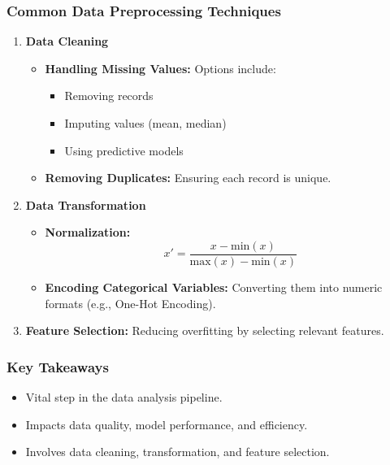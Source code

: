 \documentclass{beamer}
\begin{document}
\begin{frame}[fragile]
    \frametitle{Common Data Preprocessing Techniques}
    \begin{enumerate}
        \item \textbf{Data Cleaning}
            \begin{itemize}
                \item \textbf{Handling Missing Values:} Options include:
                    \begin{itemize}
                        \item Removing records
                        \item Imputing values (mean, median)
                        \item Using predictive models
                    \end{itemize}
                \item \textbf{Removing Duplicates:} Ensuring each record is unique.
            \end{itemize}
        \item \textbf{Data Transformation}
            \begin{itemize}
                \item \textbf{Normalization:}
                    \begin{equation} 
                    x' = \frac{x - \text{min}(x)}{\text{max}(x) - \text{min}(x)}
                    \end{equation}
                \item \textbf{Encoding Categorical Variables:} Converting them into numeric formats (e.g., One-Hot Encoding).
            \end{itemize}
        \item \textbf{Feature Selection:} Reducing overfitting by selecting relevant features.
    \end{enumerate}
\end{frame}

\begin{frame}[fragile]
    \frametitle{Key Takeaways}
    \begin{itemize}
        \item Vital step in the data analysis pipeline.
        \item Impacts data quality, model performance, and efficiency.
        \item Involves data cleaning, transformation, and feature selection.
    \end{itemize}
\end{frame}
\end{document}
